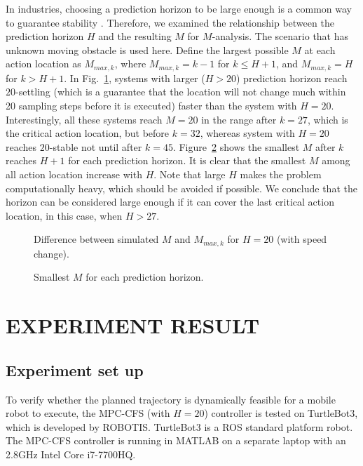 \documentclass[letterpaper, 10 pt, conference]{ieeeconf}  %
\begin{document}
In industries, choosing a prediction horizon to be large enough is a common way to guarantee stability \cite{mayne2000constrained}. Therefore, we examined the relationship between the prediction horizon $H$ and the resulting $M$ for $M$-analysis. The scenario that has unknown moving obstacle is used here. Define the largest possible $M$ at each action location as $M_{max,k}$, where $M_{max,k} = k-1$ for $k\leq H+1$, and $M_{max,k} = H$ for $k>H+1$. In Fig.~\ref{fig:HM20}, systems with larger ($H>20$) prediction horizon reach $20$-settling (which is a guarantee that the location will not change much within 20 sampling steps before it is executed) faster than the system with $H=20$. Interestingly, all these systems reach $M=20$ in the range after $k=27$, which is the critical action location, but before $k=32$, whereas system with $H=20$ reaches $20$-stable not until after $k=45$. Figure~\ref{fig:HM} shows the smallest $M$ after $k$ reaches $H+1$ for each prediction horizon. It is clear that the smallest $M$ among all action location increase with $H$. Note that large $H$ makes the problem computationally heavy, which should be avoided if possible. We conclude that the horizon can be considered large enough if it can cover the last critical action location, in this case, when $H>27$.










\begin{figure}[t]
      \centering
       
      \caption{Difference between simulated $M$ and $M_{max,k}$ for $H=20$ (with speed change). }
      \label{fig:HM20}
\end{figure}

\begin{figure}[t]
      \centering
       
      \caption{Smallest $M$ for each prediction horizon. }
      \label{fig:HM}
\end{figure}

\section{EXPERIMENT RESULT}

\subsection{Experiment set up}
To verify whether the planned trajectory is dynamically feasible for a mobile robot to execute, the MPC-CFS (with $H=20$) controller is tested on TurtleBot3, which is  developed by ROBOTIS. TurtleBot3 is a ROS standard platform robot. The MPC-CFS controller is running in MATLAB on a separate laptop with an 2.8GHz Intel Core i7-7700HQ.
\end{document}
